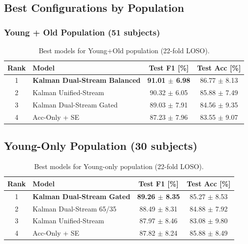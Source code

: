 \documentclass{article}
\begin{document}
\subsection{Best Configurations by Population}

\subsubsection{Young + Old Population (51 subjects)}

\begin{table}[htbp]
    \centering
    \caption{Best models for Young+Old population (22-fold LOSO).}
    \label{tab:best_young_old}
    \begin{tabular}{clcc}
        \toprule
        \textbf{Rank} & \textbf{Model} & \textbf{Test F1 [\%]} & \textbf{Test Acc [\%]} \\
        \midrule
        1 & \textbf{Kalman Dual-Stream Balanced} & \textbf{91.01 $\pm$ 6.98} & 86.77 $\pm$ 8.13 \\
        2 & Kalman Unified-Stream & 90.32 $\pm$ 6.05 & 85.88 $\pm$ 7.49 \\
        3 & Kalman Dual-Stream Gated & 89.03 $\pm$ 7.91 & 84.56 $\pm$ 9.35 \\
        4 & Acc-Only + SE & 87.23 $\pm$ 7.96 & 83.55 $\pm$ 9.07 \\
        \bottomrule
    \end{tabular}
\end{table}

\subsection{Young-Only Population (30 subjects)}

\begin{table}[htbp]
    \centering
    \caption{Best models for Young-only population (22-fold LOSO).}
    \label{tab:best_young}
    \begin{tabular}{clcc}
        \toprule
        \textbf{Rank} & \textbf{Model} & \textbf{Test F1 [\%]} & \textbf{Test Acc [\%]} \\
        \midrule
        1 & \textbf{Kalman Dual-Stream Gated} & \textbf{89.26 $\pm$ 8.35} & 85.27 $\pm$ 8.53 \\
        2 & Kalman Dual-Stream 65/35 & 88.49 $\pm$ 8.31 & 84.88 $\pm$ 7.92 \\
        3 & Kalman Unified-Stream & 87.97 $\pm$ 8.46 & 83.08 $\pm$ 9.80 \\
        4 & Acc-Only + SE & 87.82 $\pm$ 8.24 & 85.88 $\pm$ 8.49 \\
        \bottomrule
    \end{tabular}
\end{table}
\end{document}
